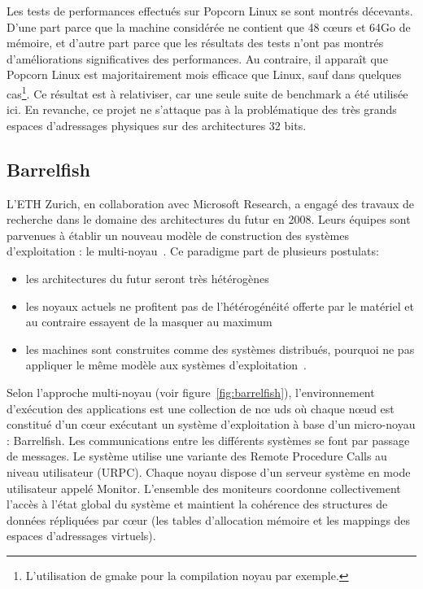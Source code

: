       Les tests de performances effectués sur Popcorn Linux se sont montrés
      décevants. D'une part parce que la machine considérée ne contient que 48
      c\oe urs et 64Go de mémoire, et d'autre part parce que les résultats des
      tests n'ont pas montrés d'améliorations significatives des
      performances. Au contraire, il apparaît que Popcorn Linux est
      majoritairement mois efficace que Linux, sauf dans quelques
      cas\footnote{L'utilisation de gmake pour la compilation noyau par
        exemple.}. Ce résultat est à relativiser, car une seule suite de
      benchmark a été utilisée ici. En revanche, ce projet ne s'attaque pas à la
      problématique des très grands espaces d'adressages physiques sur des
      architectures 32 bits.


    \subsection{Barrelfish}
      
      L’ETH Zurich, en collaboration avec Microsoft Research, a engagé des
      travaux de recherche dans le domaine des architectures du futur en
      2008. Leurs équipes sont parvenues à établir un nouveau modèle de
      construction des systèmes d’exploitation : le
      multi-noyau~\citep{baumann2009multikernel}. Ce paradigme part de plusieurs
      postulats:
      \begin{itemize}
        \item les architectures du futur seront très
          hétérogènes~\citep{schupbach2008embracing}
        \item les noyaux actuels ne profitent pas de l’hétérogénéité offerte par
          le matériel et au contraire essayent de la masquer au maximum
        \item les machines sont construites comme des systèmes distribués,
          pourquoi ne pas appliquer le même modèle aux systèmes
          d’exploitation~\citep{baumann2009your}.\\
      \end{itemize}

      Selon l’approche multi-noyau (voir figure~\ref{fig:barrelfish}),
      l'environnement d’exécution des applications est une collection de n\oe
      uds où chaque n\oe ud est constitué d’un c\oe ur exécutant un système
      d'exploitation à base d’un micro-noyau : Barrelfish. Les communications
      entre les différents systèmes se font par passage de messages. Le système
      utilise une variante des Remote Procedure Calls au niveau utilisateur
      (URPC). Chaque noyau dispose d’un serveur système en mode utilisateur
      appelé Monitor. L’ensemble des moniteurs coordonne collectivement l’accès
      à l’état global du système et maintient la cohérence des structures de
      données répliquées par c\oe ur (les tables d’allocation mémoire et les
      mappings des espaces d’adressages virtuels).\\

